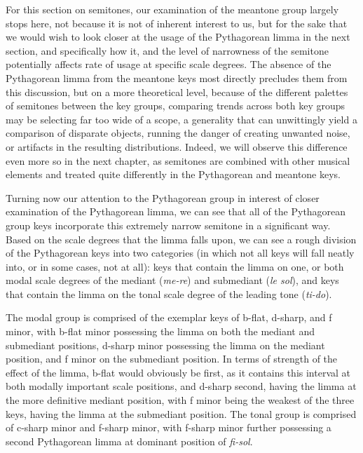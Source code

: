 For this section on semitones, our examination of the meantone group
largely stops here, not because it is not of inherent interest to us,
but for the sake that we would wish to look closer at the usage of the
Pythagorean limma in the next section, and specifically how it, and the
level of narrowness of the semitone potentially affects rate of usage at
specific scale degrees. The absence of the Pythagorean limma from the
meantone keys most directly precludes them from this discussion, but on
a more theoretical level, because of the different palettes of semitones
between the key groups, comparing trends across both key groups may be
selecting far too wide of a scope, a generality that can unwittingly
yield a comparison of disparate objects, running the danger of creating
unwanted noise, or artifacts in the resulting distributions. Indeed, we
will observe this difference even more so in the next chapter, as
semitones are combined with other musical elements and treated quite
differently in the Pythagorean and meantone keys.

Turning now our attention to the Pythagorean group in interest of closer
examination of the Pythagorean limma, we can see that all of the
Pythagorean group keys incorporate this extremely narrow semitone in a
significant way. Based on the scale degrees that the limma falls upon,
we can see a rough division of the Pythagorean keys into two categories
(in which not all keys will fall neatly into, or in some cases, not at
all): keys that contain the limma on one, or both modal scale degrees of
the mediant (\emph{me-re}) and submediant (\emph{le sol}), and keys that
contain the limma on the tonal scale degree of the leading tone
(\emph{ti-do}).

The modal group is comprised of the exemplar keys of b-flat, d-sharp,
and f minor, with b-flat minor possessing the limma on both the mediant
and submediant positions, d-sharp minor possessing the limma on the
mediant position, and f minor on the submediant position. In terms of
strength of the effect of the limma, b-flat would obviously be first, as
it contains this interval at both modally important scale positions, and
d-sharp second, having the limma at the more definitive mediant
position, with f minor being the weakest of the three keys, having the
limma at the submediant position. The tonal group is comprised of
c-sharp minor and f-sharp minor, with f-sharp minor further possessing a
second Pythagorean limma at dominant position of \emph{fi-sol}.

